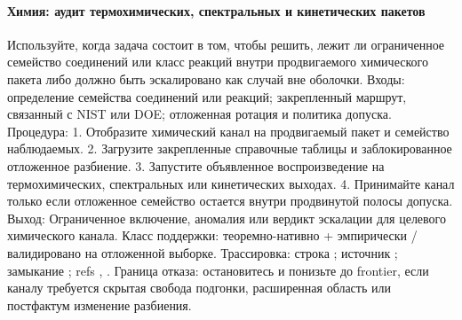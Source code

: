 \paragraph{Химия: аудит термохимических, спектральных и кинетических пакетов}
Используйте, когда задача состоит в том, чтобы решить, лежит ли ограниченное семейство соединений или класс реакций внутри продвигаемого химического пакета либо должно быть эскалировано как случай вне оболочки.
Входы: определение семейства соединений или реакций; \allowbreak закрепленный маршрут, связанный с NIST или DOE; \allowbreak отложенная ротация и политика допуска.
Процедура: 1. Отобразите химический канал на продвигаемый пакет и семейство наблюдаемых. 2. Загрузите закрепленные справочные таблицы и заблокированное отложенное разбиение. 3. Запустите объявленное воспроизведение на термохимических, спектральных или кинетических выходах. 4. Принимайте канал только если отложенное семейство остается внутри продвинутой полосы допуска.
Выход: Ограниченное включение, аномалия или вердикт эскалации для целевого химического канала.
Класс поддержки: теоремно-нативно + эмпирически / валидировано на отложенной выборке.
Трассировка: строка ; \allowbreak источник ; \allowbreak замыкание ; \allowbreak refs , \allowbreak {}.
Граница отказа: остановитесь и понизьте до frontier, если каналу требуется скрытая свобода подгонки, расширенная область или постфактум изменение разбиения.

